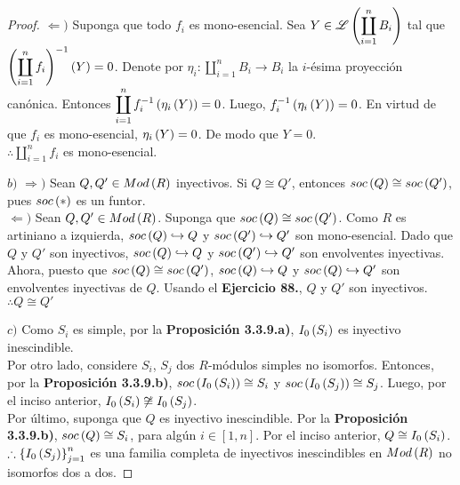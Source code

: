 \documentclass{article}
\begin{document}
\begin{enumerate}
\begin{proof}
		$\boxed{\Leftarrow )}$ Suponga que todo $f_{i}$ es mono-esencial. Sea $Y\in\mathscr{L}\left(\displaystyle\coprod_{i=1}^{n}B_{i}\right)$ tal que $\left(\displaystyle\coprod_{i=1}^{n}f_{i}\right)^{-1}\left(Y\right)=0$. Denote por $\eta_{i}:\displaystyle\coprod_{i=1}^{n}B_{i} \longrightarrow B_{i}$ la $i$-ésima proyección canónica. Entonces $\displaystyle\coprod_{i=1}^{n}f_{i}^{-1}\left(\eta_{i}\left(Y\right)\right)=0$. Luego, $f_{i}^{-1}\left(\eta_{i}\left(Y\right)\right)=0$. En virtud de que $f_{i}$ es mono-esencial, $\eta_{i}\left(Y\right)=0$. De modo que $Y=0$.\\
		$\therefore\displaystyle\coprod_{i=1}^{n}f_{i}$ es mono-esencial.
		
		$\boxed{b)}$ $\boxed{\Rightarrow )}$ Sean $Q,Q' \in Mod\left(R\right)$ inyectivos. Si $Q \cong Q'$, entonces $soc\left(Q\right) \cong soc\left(Q'\right)$, pues $soc\left(*\right)$ es un funtor.\\
		
		$\boxed{\Leftarrow )}$ Sean $Q,Q' \in Mod\left(R\right)$. Suponga que $soc\left(Q\right) \cong soc\left(Q'\right)$. Como $R$ es artiniano a izquierda, $soc\left(Q\right) \hookrightarrow Q$ y $soc\left(Q'\right) \hookrightarrow Q'$ son mono-esencial. Dado que $Q$ y $Q'$ son inyectivos, $soc\left(Q\right) \hookrightarrow Q$ y $soc\left(Q'\right) \hookrightarrow Q'$ son envolventes inyectivas. Ahora, puesto que $soc\left(Q\right) \cong soc\left(Q'\right)$, $soc\left(Q\right) \hookrightarrow Q$ y $soc\left(Q\right) \hookrightarrow Q'$ son envolventes inyectivas de $Q$. Usando el \textbf{Ejercicio 88.}, $Q$ y $Q'$ son inyectivos.\\
		$\therefore Q\cong Q'$
			
		$\boxed{c)}$ Como $S_{i}$ es simple, por la \textbf{Proposición 3.3.9.a)}, $I_{0}\left(S_{i}\right)$ es inyectivo inescindible.\\
			
		Por otro lado, considere $S_{i}$, $S_{j}$ dos $R$-módulos simples no isomorfos. Entonces, por la \textbf{Proposición 3.3.9.b)}, $soc\left(I_{0}\left(S_{i}\right)\right) \cong S_{i}$ y $soc\left(I_{0}\left(S_{j}\right)\right) \cong S_{j}$. Luego, por el inciso anterior, $I_{0}\left(S_{i}\right) \not\cong I_{0}\left(S_{j}\right)$.\\
			
		Por último, suponga que $Q$ es inyectivo inescindible. Por la \textbf{Proposición 3.3.9.b)}, $soc\left(Q\right) \cong S_{i}$, para algún $i \in [1,n]$. Por el inciso anterior, $Q \cong I_{0}\left(S_{i}\right)$.\\
		$\therefore\left\{I_{0}\left(S_{j}\right)\right\}_{j=1}^{n}$ es una familia completa de inyectivos inescindibles en $Mod\left(R\right)$ no isomorfos dos a dos.
	\end{proof}
	

\end{enumerate}
\end{document}
